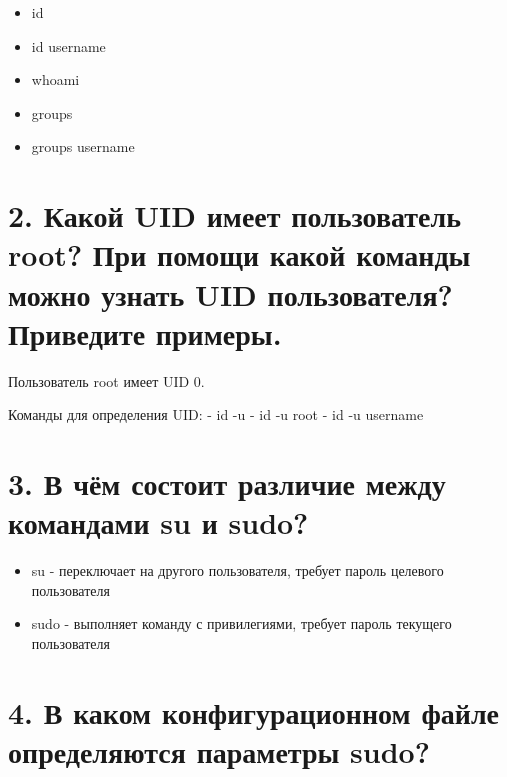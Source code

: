\documentclass[
  12pt,
  a4paper,
  DIV=11,
  numbers=noendperiod]{scrreprt}
\providecommand{\tightlist}{%
  \setlength{\itemsep}{0pt}\setlength{\parskip}{0pt}}\usepackage{longtable,booktabs,array}
\begin{document}
\begin{itemize}
\tightlist
\item
  id
\item
  id username
\item
  whoami
\item
  groups
\item
  groups username
\end{itemize}

\section{2. Какой UID имеет пользователь root? При помощи какой команды
можно узнать UID пользователя? Приведите
примеры.}\label{ux43aux430ux43aux43eux439-uid-ux438ux43cux435ux435ux442-ux43fux43eux43bux44cux437ux43eux432ux430ux442ux435ux43bux44c-root-ux43fux440ux438-ux43fux43eux43cux43eux449ux438-ux43aux430ux43aux43eux439-ux43aux43eux43cux430ux43dux434ux44b-ux43cux43eux436ux43dux43e-ux443ux437ux43dux430ux442ux44c-uid-ux43fux43eux43bux44cux437ux43eux432ux430ux442ux435ux43bux44f-ux43fux440ux438ux432ux435ux434ux438ux442ux435-ux43fux440ux438ux43cux435ux440ux44b.}

Пользователь root имеет UID 0.

Команды для определения UID: - id -u - id -u root - id -u username

\section{3. В чём состоит различие между командами su и
sudo?}\label{ux432-ux447ux451ux43c-ux441ux43eux441ux442ux43eux438ux442-ux440ux430ux437ux43bux438ux447ux438ux435-ux43cux435ux436ux434ux443-ux43aux43eux43cux430ux43dux434ux430ux43cux438-su-ux438-sudo}

\begin{itemize}
\tightlist
\item
  su - переключает на другого пользователя, требует пароль целевого
  пользователя
\item
  sudo - выполняет команду с привилегиями, требует пароль текущего
  пользователя
\end{itemize}

\section{4. В каком конфигурационном файле определяются параметры
sudo?}\label{ux432-ux43aux430ux43aux43eux43c-ux43aux43eux43dux444ux438ux433ux443ux440ux430ux446ux438ux43eux43dux43dux43eux43c-ux444ux430ux439ux43bux435-ux43eux43fux440ux435ux434ux435ux43bux44fux44eux442ux441ux44f-ux43fux430ux440ux430ux43cux435ux442ux440ux44b-sudo}
\end{document}
